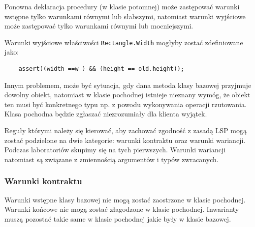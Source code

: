 \begin{mybox}
Ponowna deklaracja procedury (w klasie potomnej) może zastępować warunki wstępne tylko warunkami równymi lub słabszymi, natomiast warunki wyjściowe może zastępować tylko warunkami równymi lub mocniejszymi.
\end{mybox}

Warunki wyjściowe właściwości \texttt{Rectangle.Width} mogłyby zostać zdefiniowane jako:
\begin{lstlisting}
	assert((width ==w ) && (height == old.height));
\end{lstlisting}

Innym problemem, może być sytuacja, gdy dana metoda klasy bazowej przyjmuje dowolny obiekt, natomiast w klasie pochodnej istnieje nieznany wymóg, że obiekt ten musi być konkretnego typu np. z powodu wykonywania operacji rzutowania. Klasa pochodna będzie zgłaszać niezrozumiały dla klienta wyjątek.

Reguły którymi należy się kierować, aby zachować zgodność z zasadą LSP mogą zostać podzielone na dwie kategorie: warunki kontraktu oraz warunki wariancji. Podczas laboratoriów skupimy się na tych pierwszych. Warunki wariancji natomiast są związane z zmiennością argumentów i typów zwracanych. 


\subsubsection{Warunki kontraktu}
Warunki wstępne klasy bazowej nie mogą zostać zaostrzone w klasie pochodnej. Warunki końcowe nie mogą zostać złagodzone w klasie pochodnej. Inwarianty muszą pozostać takie same w klasie pochodnej jakie były w klasie bazowej.


